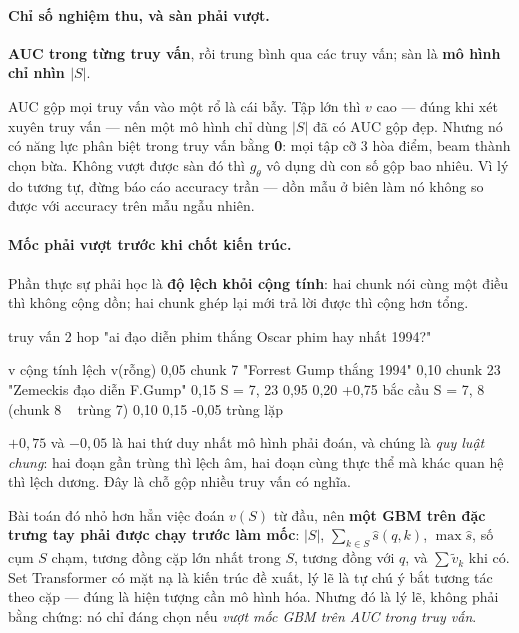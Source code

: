 \documentclass[11pt,a4paper]{article}
\begin{document}
\paragraph{Chỉ số nghiệm thu, và sàn phải vượt.} \textbf{AUC trong từng truy vấn}, rồi trung
bình qua các truy vấn; sàn là \textbf{mô hình chỉ nhìn $|S|$}.

AUC gộp mọi truy vấn vào một rổ là cái bẫy. Tập lớn thì $v$ cao --- đúng khi xét xuyên truy
vấn --- nên một mô hình chỉ dùng $|S|$ đã có AUC gộp đẹp. Nhưng nó có năng lực phân biệt
trong truy vấn bằng \textbf{0}: mọi tập cỡ 3 hòa điểm, beam thành chọn bừa. Không vượt được
sàn đó thì $g_\theta$ vô dụng dù con số gộp bao nhiêu. Vì lý do tương tự, đừng báo cáo
accuracy trần --- dồn mẫu ở biên làm nó không so được với accuracy trên mẫu ngẫu nhiên.

\paragraph{Mốc phải vượt trước khi chốt kiến trúc.} Phần thực sự phải học là \textbf{độ lệch
khỏi cộng tính}: hai chunk nói cùng một điều thì không cộng dồn; hai chunk ghép lại mới trả
lời được thì cộng hơn tổng.

\begin{dia}
truy vấn 2 hop "ai đạo diễn phim thắng Oscar phim hay nhất 1994?"

                                       v     cộng tính    lệch
v(rỗng)                              0,05
chunk 7  "Forrest Gump thắng 1994"   0,10
chunk 23 "Zemeckis đạo diễn F.Gump"  0,15
S = {7, 23}                          0,95     0,20      +0,75   bắc cầu
S = {7, 8}  (chunk 8 ~ trùng 7)      0,10     0,15      -0,05   trùng lặp
\end{dia}

$+0{,}75$ và $-0{,}05$ là hai thứ duy nhất mô hình phải đoán, và chúng là \emph{quy luật
chung}: hai đoạn gần trùng thì lệch âm, hai đoạn cùng thực thể mà khác quan hệ thì lệch
dương. Đây là chỗ gộp nhiều truy vấn có nghĩa.

Bài toán đó nhỏ hơn hẳn việc đoán $v(S)$ từ đầu, nên \textbf{một GBM trên đặc trưng tay phải
được chạy trước làm mốc}: $|S|$, $\sum_{k\in S}\hat s(q,k)$, $\max\hat s$, số cụm $S$ chạm,
tương đồng cặp lớn nhất trong $S$, tương đồng với $q$, và $\sum\tilde v_k$ khi có. Set
Transformer có mặt nạ là kiến trúc đề xuất, lý lẽ là tự chú ý bắt tương tác theo cặp --- đúng
là hiện tượng cần mô hình hóa. Nhưng đó là lý lẽ, không phải bằng chứng: nó chỉ đáng chọn nếu
\emph{vượt mốc GBM trên AUC trong truy vấn}.
\end{document}
